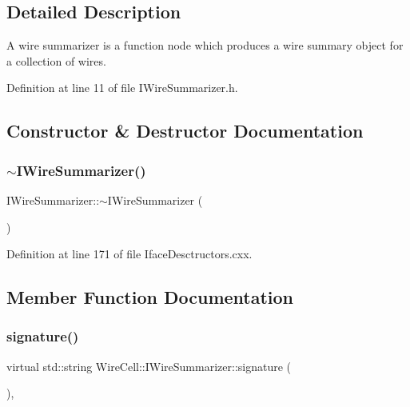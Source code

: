 \subsection{Detailed Description}
A wire summarizer is a function node which produces a wire summary object for a collection of wires. 

Definition at line 11 of file I\+Wire\+Summarizer.\+h.



\subsection{Constructor \& Destructor Documentation}
\mbox{\label{class_wire_cell_1_1_i_wire_summarizer_aa0442b80eeba9642175c3afce494c23d}} 
\subsubsection{\texorpdfstring{$\sim$\+I\+Wire\+Summarizer()}{~IWireSummarizer()}}
{\footnotesize\ttfamily I\+Wire\+Summarizer\+::$\sim$\+I\+Wire\+Summarizer (\begin{DoxyParamCaption}{ }\end{DoxyParamCaption})\hspace{0.3cm}{\ttfamily [virtual]}}



Definition at line 171 of file Iface\+Desctructors.\+cxx.



\subsection{Member Function Documentation}
\mbox{\label{class_wire_cell_1_1_i_wire_summarizer_aad4b2478a6e204a3333f3aa84e36a99a}} 
\subsubsection{\texorpdfstring{signature()}{signature()}}
{\footnotesize\ttfamily virtual std\+::string Wire\+Cell\+::\+I\+Wire\+Summarizer\+::signature (\begin{DoxyParamCaption}{ }\end{DoxyParamCaption})\hspace{0.3cm}{\ttfamily [inline]}, {\ttfamily [virtual]}}



